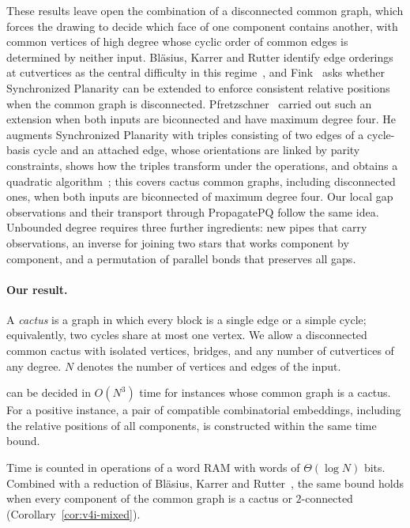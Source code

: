 These results leave open the combination of a disconnected common graph,
which forces the drawing to decide which face of one component contains
another, with common vertices of high degree whose cyclic order of common
edges is determined by neither input. Bl\"asius, Karrer and Rutter identify
edge orderings at cutvertices as the central difficulty in this
regime~\cite{BKR18}, and Fink~\cite[Section~6.7]{Fin24} asks whether
Synchronized Planarity can be extended to enforce consistent relative
positions when the common graph is disconnected.
Pfretzschner~\cite[Chapter~8]{Pfr22} carried out such an extension when
both inputs are biconnected and have maximum degree four. He augments
Synchronized Planarity with triples consisting of two edges of a
cycle-basis cycle and an attached edge, whose orientations are linked by
parity constraints, shows how the triples transform under the operations,
and obtains a quadratic algorithm~\cite[Theorem~8.16]{Pfr22}; this covers
cactus common graphs, including disconnected ones, when both inputs are
biconnected of maximum degree four. Our local gap observations and their
transport through PropagatePQ follow the same idea. Unbounded degree
requires three further ingredients: new pipes that carry observations, an
inverse for joining two stars that works component by component, and a
permutation of parallel bonds that preserves all gaps.

\paragraph{Our result.}
A \emph{cactus} is a graph in which every block is a single edge or a simple
cycle; equivalently, two cycles share at most one vertex. We allow a
disconnected common cactus with isolated vertices, bridges, and any number
of cutvertices of any degree. $N$ denotes the number of vertices and edges
of the input.

\begin{theorem}\label{thm:main}
\sefe{} can be decided in $O(N^3)$ time for instances whose common graph is
a cactus. For a positive instance, a pair of compatible combinatorial
embeddings, including the relative positions of all components, is
constructed within the same time bound.
\end{theorem}

Time is counted in operations of a word RAM with words of $\Theta(\log N)$
bits. Combined with a reduction of Bl\"asius, Karrer and
Rutter~\cite{BKR18}, the same bound holds when every component of the common
graph is a cactus or $2$-connected (Corollary~\ref{cor:v4i-mixed}).

